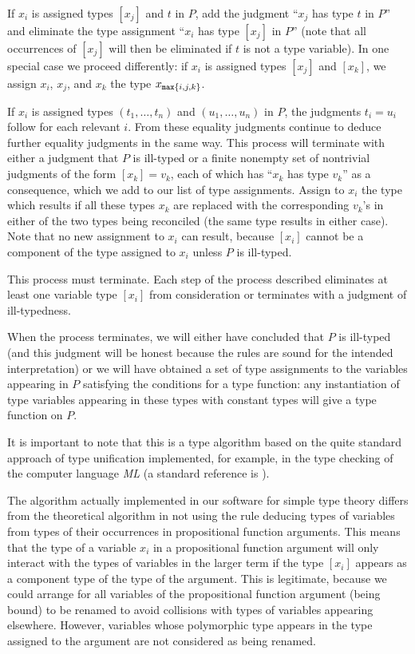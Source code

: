 \documentclass{article}
\begin{document}
\begin{description}
If $x_i$ is assigned types $[x_j]$ and $t$ in $P$, add the judgment
``$x_j$ has type $t$ in $P$'' and eliminate the type assignment
``$x_i$ has type $[x_j]$ in $P$'' (note that all occurrences of
$[x_j]$ will then be eliminated if $t$ is not a type variable).  In
one special case we proceed differently: if $x_i$ is assigned types
$[x_j]$ and $[x_k]$, we assign $x_i$, $x_j$, and $x_k$ the type
$x_{{\tt max}\{i,j,k\}}$.  

If $x_i$ is assigned types $(t_1,\ldots,t_n)$ and $(u_1,\ldots,u_n)$
in $P$, the judgments $t_i=u_i$ follow for each relevant $i$.  From
these equality judgments continue to deduce further equality judgments
in the same way.  This process will terminate with either a judgment
that $P$ is ill-typed or a finite nonempty set of nontrivial judgments
of the form $[x_k] = v_k$, each of which has ``$x_k$ has type $v_k$''
as a consequence, which we add to our list of type assignments.
Assign to $x_i$ the type which results if all these types $x_k$ are
replaced with the corresponding $v_k$'s in either of the two types
being reconciled (the same type results in either case).  Note that no
new assignment to $x_i$ can result, because $[x_i]$ cannot be a
component of the type assigned to $x_i$ unless $P$ is ill-typed.

This process must terminate.  Each step of the process described
eliminates at least one variable type $[x_i]$ from consideration or
terminates with a judgment of ill-typedness.

When the process terminates, we will either have concluded that $P$ is
ill-typed (and this judgment will be honest because the rules are
sound for the intended interpretation) or we will have obtained a set
of type assignments to the variables appearing in $P$ satisfying the
conditions for a type function: any instantiation of type variables
appearing in these types with constant types will give a type function
on $P$.

It is important to note that this is a type algorithm based on the
quite standard approach of type unification implemented, for example,
in the type checking of the computer language {\em ML\/} (a standard
reference is \cite{unification}).

\end{description}

The algorithm actually implemented in our software for simple type
theory differs from the theoretical algorithm in not using the rule
deducing types of variables from types of their occurrences in
propositional function arguments.  This means that the type of a
variable $x_i$ in a propositional function argument will only interact
with the types of variables in the larger term if the type $[x_i]$
appears as a component type of the type of the argument.  This is
legitimate, because we could arrange for all variables of the
propositional function argument (being bound) to be renamed to avoid
collisions with types of variables appearing elsewhere.  However,
variables whose polymorphic type appears in the type assigned to the
argument are not considered as being renamed.
\end{document}
